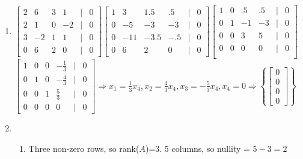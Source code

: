 \documentclass[12pt]{article}
\begin{document}
\begin{enumerate}
  \item $\begin{bmatrix} 2 & 6 & 3 & 1 & | & 0\\ 2 & 1 & 0 & -2 & | & 0\\ 3 & -2 & 1 & 1 & | & 0\\ 0 & 6 & 2 & 0 & | & 0\end{bmatrix}\widetilde{ }\begin{bmatrix} 1 & 3 & 1.5 & .5 & | & 0\\ 0 & -5 & -3 & -3 & | & 0\\ 0 & -11 & -3.5 & -.5 & | & 0\\ 0 & 6 & 2 & 0 & | & 0  \end{bmatrix}\widetilde{ }\begin{bmatrix} 1 & 0 & .5 & .5 & | & 0\\ 0 & 1 & -1 & -3 & | & 0\\ 0 & 0 & 3 & 5 & | & 0\\ 0 & 0 & 0 & 0 & | & 0\\  \end{bmatrix}\widetilde{ }$\\
    $\begin{bmatrix} 1 & 0 & 0 & -\frac{1}{3} & | & 0\\ 0 & 1 & 0 & -\frac{4}{3} & | & 0\\ 0 & 0 & 1 & \frac{5}{3} & | & 0\\ 0 & 0 & 0 & 0 & | & 0 \end{bmatrix} \Rightarrow x_1=\frac{1}{3}x_4,x_2=\frac{4}{3}x_4,x_3=-\frac{5}{3}x_4,x_4=0\Rightarrow \left\{ \begin{bmatrix} 0\\0\\0\\0 \end{bmatrix}\right\}$

    \setcounter{enumi}{40}

  \item

    \begin{enumerate}

      \item Three non-zero rows, so rank($A$)=3. 5 columns, so nullity = $5-3 =2$


\end{enumerate}
\end{enumerate}
\end{document}
